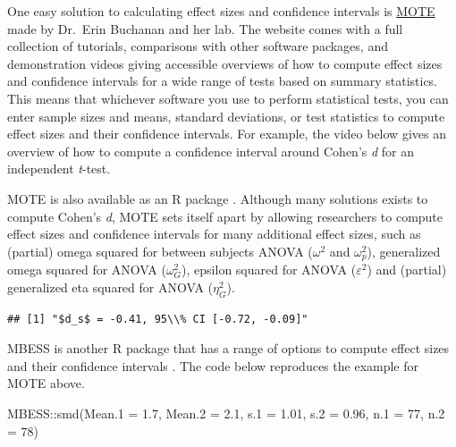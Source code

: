 \documentclass[
  oneside]{krantz}
\makeatletter
\newenvironment{Shaded}{\begin{snugshade}}{\end{snugshade}}
\newcommand{\AttributeTok}[1]{\textcolor[rgb]{0.61,0.61,0.61}{#1}}
\newcommand{\DecValTok}[1]{\textcolor[rgb]{0.06,0.06,0.06}{#1}}
\newcommand{\FloatTok}[1]{\textcolor[rgb]{0.06,0.06,0.06}{#1}}
\newcommand{\FunctionTok}[1]{\textcolor[rgb]{0,0,0}{#1}}
\newcommand{\NormalTok}[1]{#1}
\newcommand{\SpecialCharTok}[1]{\textcolor[rgb]{0,0,0}{#1}}
\newenvironment{kframe}{%
\medskip{}
\setlength{\fboxsep}{.8em}
 \def\at@end@of@kframe{}%
 \ifinner\ifhmode%
  \def\at@end@of@kframe{\end{minipage}}%
  \begin{minipage}{\columnwidth}%
 \fi\fi%
 \def\FrameCommand##1{\hskip\@totalleftmargin \hskip-\fboxsep
 \colorbox{shadecolor}{##1}\hskip-\fboxsep
     \hskip-\linewidth \hskip-\@totalleftmargin \hskip\columnwidth}%
 \MakeFramed {\advance\hsize-\width
   \@totalleftmargin\z@ \linewidth\hsize
   \@setminipage}}%
 {\par\unskip\endMakeFramed%
 \at@end@of@kframe}
\renewenvironment{Shaded}{\begin{kframe}}{\end{kframe}}
\makeatother
\begin{document}
One easy solution to calculating effect sizes and confidence intervals is \href{https://www.aggieerin.com/shiny-server/}{MOTE} made by Dr.~Erin Buchanan and her lab. The website comes with a full collection of tutorials, comparisons with other software packages, and demonstration videos giving accessible overviews of how to compute effect sizes and confidence intervals for a wide range of tests based on summary statistics. This means that whichever software you use to perform statistical tests, you can enter sample sizes and means, standard deviations, or test statistics to compute effect sizes and their confidence intervals. For example, the video below gives an overview of how to compute a confidence interval around Cohen's \emph{d} for an independent \emph{t}-test.

MOTE is also available as an R package \citep{buchanan_mote_2017}. Although many solutions exists to compute Cohen's \emph{d}, MOTE sets itself apart by allowing researchers to compute effect sizes and confidence intervals for many additional effect sizes, such as (partial) omega squared for between subjects ANOVA (\(\omega^{2}\) and \(\omega^{2}_p\)), generalized omega squared for ANOVA (\(\omega^{2}_G\)), epsilon squared for ANOVA (\(\varepsilon^{2}\)) and (partial) generalized eta squared for ANOVA (\(\eta^{2}_G\)).

\begin{Shaded}
\end{Shaded}

\begin{verbatim}
## [1] "$d_s$ = -0.41, 95\\% CI [-0.72, -0.09]"
\end{verbatim}

MBESS is another R package that has a range of options to compute effect sizes and their confidence intervals \citep{kelley_confidence_2007}. The code below reproduces the example for MOTE above.

\begin{Shaded}
\begin{Highlighting}[]
\NormalTok{MBESS}\SpecialCharTok{::}\FunctionTok{smd}\NormalTok{(}\AttributeTok{Mean.1 =} \FloatTok{1.7}\NormalTok{, }\AttributeTok{Mean.2 =} \FloatTok{2.1}\NormalTok{, }\AttributeTok{s.1 =} \FloatTok{1.01}\NormalTok{, }\AttributeTok{s.2 =} \FloatTok{0.96}\NormalTok{, }\AttributeTok{n.1 =} \DecValTok{77}\NormalTok{, }\AttributeTok{n.2 =} \DecValTok{78}\NormalTok{)}
\end{Highlighting}
\end{Shaded}
\end{document}
